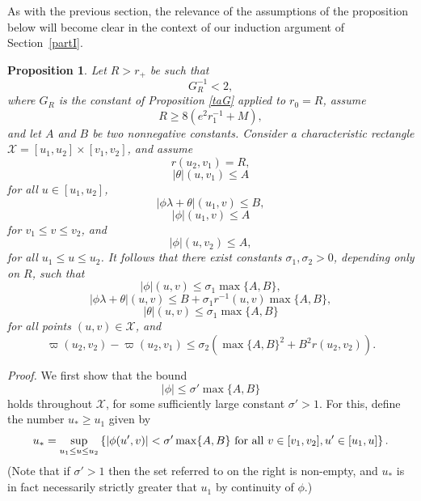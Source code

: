 \documentclass{article}
\newtheorem{proposition}{Proposition}[section]
\begin{document}
As with the previous section, the relevance of the assumptions
of the proposition below will become clear in the context of our
induction argument of Section~\ref{partI}.
\begin{proposition}
\label{sprpro}
Let $R>r_+$ be such that 
\begin{equation}
\label{Rblak1}
G_R^{-1}<2,
\end{equation}
where $G_R$ is the constant of 
Proposition \ref{taG} applied to $r_0=R$, assume
\begin{equation}
\label{Rblak2}
R\ge 8(e^2r_1^{-1}+M),
\end{equation}
and let $A$ and $B$ be two nonnegative constants.
Consider a characteristic
rectangle $\mathcal{X}=[u_1,u_2]\times[v_1,v_2]$,
and assume
\[
r(u_2,v_1)=R,
\]
\begin{equation}
\label{3ast}
|\theta|(u,v_1)\le A
\end{equation}
for all $u\in[u_1,u_2]$, 
\begin{equation}
\label{kaiv1}
|\phi\lambda+\theta|(u_1,v)\le B,
\end{equation}
\begin{equation}
\label{kaiv2}
|\phi|(u_1,v)\le A
\end{equation}
for $v_1\le v\le v_2$,
and 
\begin{equation}
\label{kaiv3}
|\phi|(u,v_2)\le A,
\end{equation}
for all $u_1\le u\le u_2$.
It follows that there exist constants $\sigma_1,\sigma_2>0$, depending
only on $R$,
such that
\begin{equation}
\label{phifragma}
|\phi|(u,v)\le\sigma_1\max\{A,B\},
\end{equation}
\begin{equation}
\label{plfragma}
|\phi\lambda+\theta|(u,v)\le B+\sigma_1r^{-1}(u,v)\max\{A,B\},
\end{equation}
\begin{equation}
\label{thetafragma}
|\theta|(u,v)\le\sigma_1\max\{A,B\}
\end{equation}
for all points $(u,v)\in\mathcal{X}$,
and 
\begin{equation}
\label{TOP-flux}
\varpi(u_2,v_2)-\varpi(u_2,v_1)
\le\sigma_2\left(\max\{A,B\}^2+B^2r(u_2,v_2)\right).
\end{equation}
\end{proposition}
\noindent\emph{Proof.}
We first show that the bound
\begin{equation}
\label{prwtaauto}
|\phi|\le\sigma'\max\{A,B\}
\end{equation}
holds throughout $\mathcal{X}$, for some sufficiently large
constant $\sigma'>1$. 
For this, define the number $u_*\ge u_{1}$ given by
\[
u_*=\sup_{u_1\le u\le u_2}
\left\{|\phi(u',v)|<\sigma'\max\{A,B\}
{\rm\ for\ all\ }v\in[v_1,v_2],u'\in[u_1,u]
\right\}.
\]
(Note that if $\sigma'>1$ then the set referred to on the right is non-empty,
and $u_*$ is in fact necessarily strictly greater that $u_{1}$ by continuity of $\phi$.)
\end{document}
